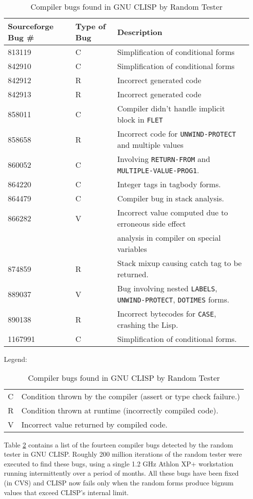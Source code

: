 \documentclass[11pt]{article}
\begin{document}
\begin{table}
\begin{center}
\begin{tabular}{|l|l|l|}
\hline Sourceforge Bug \# & Type of Bug & Description \\
\hline
813119 & C & Simplification of conditional forms \\
842910 & C & Simplification of conditional forms \\
842912 & R & Incorrect generated code \\
842913 & R & Incorrect generated code \\
858011 & C & Compiler didn't handle implicit block in {\tt FLET} \\
858658 & R & Incorrect code for {\tt UNWIND-PROTECT} and multiple values \\
860052 & C & Involving {\tt RETURN-FROM} and {\tt MULTIPLE-VALUE-PROG1}. \\
864220 & C & Integer tags in tagbody forms. \\
864479 & C & Compiler bug in stack analysis. \\
866282 & V & Incorrect value computed due to erroneous side effect \\
& & analysis in compiler on special variables \\
874859 & R & Stack mixup causing catch tag to be returned. \\
889037 & V & Bug involving nested {\tt LABELS}, {\tt UNWIND-PROTECT},
{\tt DOTIMES} forms. \\
890138 & R & Incorrect bytecodes for {\tt CASE}, crashing the Lisp. \\
1167991 & C & Simplification of conditional forms. \\ \hline
\end{tabular}

Legend:
\begin{tabular}{ll}
C & Condition thrown by the compiler (assert or type check failure.) \\
R & Condition thrown at runtime (incorrectly compiled code). \\
V & Incorrect value returned by compiled code. \\
\end{tabular}
\end{center}
\caption{\label{clispbugs} Compiler bugs found in GNU CLISP by Random Tester}
\end{table}

Table \ref{clispbugs} contains a list of the fourteen compiler bugs
detected by the random tester in GNU CLISP.  Roughly 200 million
iterations of the random tester were executed to find these bugs,
using a single 1.2 GHz Athlon XP+ workstation running intermittently
over a period of months.  All these bugs have been fixed (in CVS) and
CLISP now fails only when the random forms produce bignum values that
exceed CLISP's internal limit.
\end{document}
